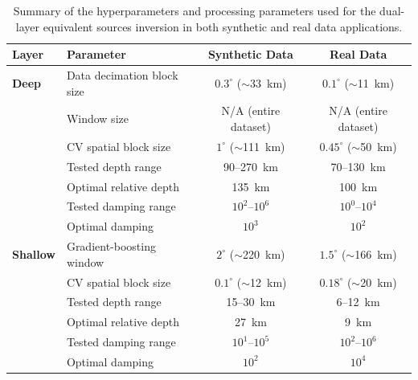 \begin{table}[ht!]
    \centering
    \caption{Summary of the hyperparameters and processing parameters used for
    the dual-layer equivalent sources inversion in both synthetic and real
    data applications.}
    \label{tab_parameters}
    \begin{tabular}{llcc}
        \toprule
        \textbf{Layer} & \textbf{Parameter} & \textbf{Synthetic Data} & \textbf{Real Data} \\
        \midrule
        \textbf{Deep}  & Data decimation block size & $0.3^{\circ}$ ($\sim$33~km) & $0.1^{\circ}$ ($\sim$11~km) \\
                       & Window size                & N/A (entire dataset)      & N/A (entire dataset) \\
                       & CV spatial block size      & $1^{\circ}$ ($\sim$111~km)& $0.45^{\circ}$ ($\sim$50~km) \\
                       & Tested depth range         & 90--270~km                & 70--130~km \\
                       & Optimal relative depth     & 135~km                    & 100~km \\
                       & Tested damping range       & $10^{2}$--$10^{6}$        & $10^{0}$--$10^{4}$ \\
                       & Optimal damping            & $10^{3}$                  & $10^{2}$ \\
        \midrule
        \textbf{Shallow}& Gradient-boosting window  & $2^{\circ}$ ($\sim$220~km)& $1.5^{\circ}$ ($\sim$166~km) \\
                       & CV spatial block size      & $0.1^{\circ}$ ($\sim$12~km)& $0.18^{\circ}$ ($\sim$20~km) \\
                       & Tested depth range         & 15--30~km                 & 6--12~km \\
                       & Optimal relative depth     & 27~km                     & 9~km \\
                       & Tested damping range       & $10^{1}$--$10^{5}$        & $10^{2}$--$10^{6}$ \\
                       & Optimal damping            & $10^{2}$                  & $10^{4}$ \\
        \bottomrule
    \end{tabular}
\end{table}

